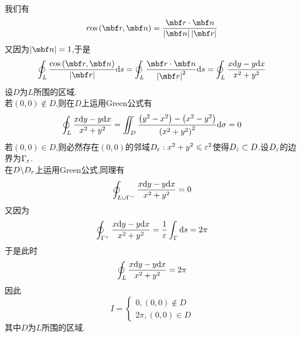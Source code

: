 \documentclass{ctexart}
\begin{document}
\begin{solution}
    我们有
    \[\cos\left(\mbf r,\mbf n\right)=\dfrac{\mbf r\cdot\mbf n}{\left|\mbf n\right|\left|\mbf r\right|}\]
    又因为$\left|\mbf n\right|=1$,于是
    \[\oint_{L}\dfrac{\cos\left(\mbf r,\mbf n\right)}{\left|\mbf r\right|}\di s
    =\oint_{L}\dfrac{\mbf r\cdot\mbf n}{\left|\mbf r\right|^2}\di s
    =\oint_{L}\dfrac{x\di y-y\di x}{x^2+y^2}\]
    设$D$为$L$所围的区域.\\
    若$(0,0)\notin D$,则在$D$上运用Green公式有
    \[\oint_{L}\dfrac{x\mathrm{d} y-y\mathrm{d} x}{x^2+y^2}=\iint_D\dfrac{\left(y^2-x^2\right)-\left(x^2-y^2\right)}{\left(x^2+y^2\right)^2}\mathrm{d}\sigma=0\]
    若$(0,0)\in D$,则必然存在$(0,0)$的邻域$D_\varepsilon:x^2+y^2\leqslant\varepsilon^2$使得$D_\varepsilon\subset D$.设$D_\varepsilon$的边界为$\Gamma_\varepsilon$.\\
    在$D\backslash D_\varepsilon$上运用Green公式,同理有
    \[\oint_{L\cup\Gamma^-}\dfrac{x\mathrm{d} y-y\mathrm{d} x}{x^2+y^2}=0\]
    又因为
    \[\oint_{\Gamma^+}\dfrac{x\mathrm{d} y-y\mathrm{d} x}{x^2+y^2}=\dfrac{1}{\varepsilon}\int_{\Gamma}\mathrm{d} s=2\pi\]
    于是此时
    \[\oint_{L}\dfrac{x\mathrm{d} y-y\mathrm{d} x}{x^2+y^2}=2\pi\]
    因此
    \[I=\left\{\begin{array}{l}
        0,(0,0)\notin D \\
        2\pi,(0,0)\in D
    \end{array}\right.\]
    其中$D$为$L$所围的区域.
\end{solution}
\end{document}
